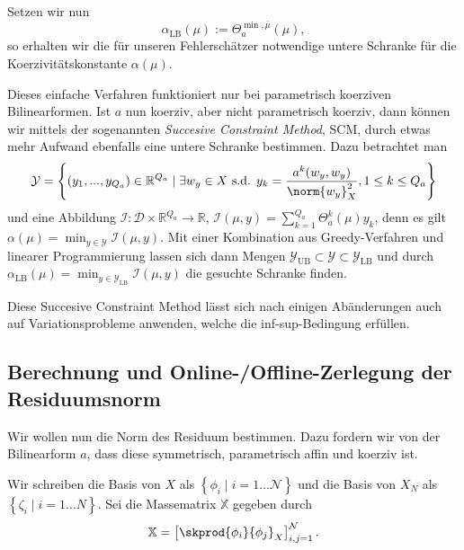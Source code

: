 Setzen wir nun
\begin{equation}
    \alpha_\text{LB}(\mu) := \Theta_a^{\min, \bar \mu}(\mu),
\end{equation}
so erhalten wir die für unseren Fehlerschätzer notwendige untere Schranke für die Koerzivitätskonstante $\alpha(\mu)$.

Dieses einfache Verfahren funktioniert nur bei parametrisch koerziven Bilinearformen. Ist $a$ nun koerziv, aber nicht parametrisch koerziv, dann können wir mittels der sogenannten \emph{Succesive Constraint Method}, SCM, durch etwas mehr Aufwand ebenfalls eine untere Schranke bestimmen. Dazu betrachtet man
\begin{equation}
    \mathcal Y = \left\{ (y_1, ..., y_{Q_a}) \in \mathbb{R}^{Q_a} \mid \exists w_y \in X \text{ s.d. } y_k = \frac{a^k(w_y, w_y)}{\norm{w_y}^2_X}, 1 \leq k \leq Q_a \right\}
\end{equation}
und eine Abbildung $\mathcal I \colon \mathcal D \times \mathbb{R}^{Q_a} \to \mathbb{R}$, $\mathcal I(\mu, y) = \sum_{k=1}^{Q_a} \Theta^k_a(\mu) y_k$, denn es gilt $\alpha(\mu) = \min_{y \in \mathcal Y} \mathcal I(\mu, y)$.
Mit einer Kombination aus Greedy-Verfahren und linearer Programmierung lassen sich dann Mengen $\mathcal Y_\text{UB} \subset \mathcal Y \subset \mathcal Y_\text{LB}$ und durch $\alpha_\text{LB}(\mu) = \min_{y \in \mathcal Y_\text{LB}} \mathcal I(\mu, y)$ die gesuchte Schranke finden.

Diese Succesive Constraint Method lässt sich nach einigen Abänderungen auch auf Variationsprobleme anwenden, welche die inf-sup-Bedingung erfüllen.


\subsection{Berechnung und Online-/Offline-Zerlegung der Residuumsnorm} %
\label{sub:online_offline_zerlegung_von_norm}

Wir wollen nun die Norm des Residuum bestimmen. Dazu fordern wir von der Bilinearform $a$, dass diese symmetrisch, parametrisch affin und koerziv ist.

Wir schreiben die Basis von $X$ als $\left\{ \phi_i \mid i = 1 \ldots \mathcal N \right\}$ und die Basis von $X_N$ als $\left\{ \zeta_i \mid i = 1 \ldots N \right\}$.
Sei die Massematrix $\mathbb{X}$ gegeben durch
\begin{equation}
    \mathbb{X} = \left[ \skprod{\phi_i}{\phi_j}_X \right]_{i,j=1}^{\mathcal N}.
\end{equation}

